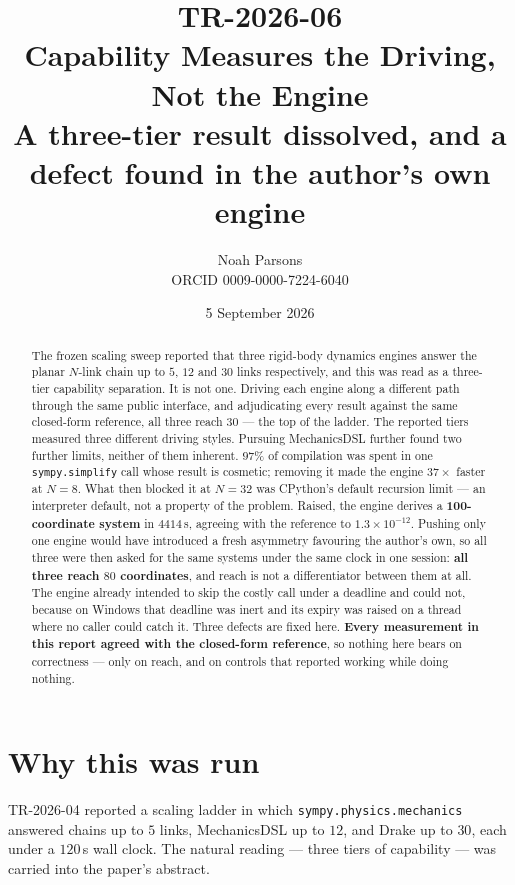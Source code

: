 \documentclass[11pt,a4paper]{article}
\title{\textbf{TR-2026-06}\\[0.3em]
Capability Measures the Driving, Not the Engine\\[0.2em]
\large A three-tier result dissolved, and a defect found in the author's own engine}
\author{Noah Parsons\\[0.2em]
\small ORCID 0009-0000-7224-6040}
\date{5 September 2026}
\newcommand{\code}[1]{\texttt{\small #1}}
\begin{document}
\maketitle

\begin{abstract}
\noindent
The frozen scaling sweep reported that three rigid-body dynamics engines answer
the planar $N$-link chain up to $5$, $12$ and $30$ links respectively, and this
was read as a three-tier capability separation. It is not one. Driving each
engine along a different path through the same public interface, and adjudicating
every result against the same closed-form reference, all three reach $30$ --- the
top of the ladder. The reported tiers measured three different driving styles.
Pursuing MechanicsDSL further found two further limits, neither of them
inherent. $97\%$ of compilation was spent in one \code{sympy.simplify} call
whose result is cosmetic; removing it made the engine $37\times$ faster at
$N=8$. What then blocked it at $N=32$ was CPython's default recursion limit ---
an interpreter default, not a property of the problem. Raised, the engine
derives a \textbf{100-coordinate system} in $4414$\,s, agreeing with the
reference to $1.3\times10^{-12}$. Pushing only one engine would have introduced a
fresh asymmetry favouring the author's own, so all three were then asked for
the same systems under the same clock in one session: \textbf{all three reach $80$
coordinates}, and reach is not a differentiator between them at all. The engine already intended to skip the costly call under a
deadline and could not, because on Windows that deadline was inert and its
expiry was raised on a thread where no caller could catch it. Three defects are
fixed here. \textbf{Every measurement in this report agreed with the closed-form
reference}, so nothing here bears on correctness --- only on reach, and on
controls that reported working while doing nothing.
\end{abstract}

\section{Why this was run}

TR-2026-04 reported a scaling ladder in which \code{sympy.physics.mechanics}
answered chains up to $5$ links, MechanicsDSL up to $12$, and Drake up to $30$,
each under a $120$\,s wall clock. The natural reading --- three tiers of
capability --- was carried into the paper's abstract.
\end{document}
